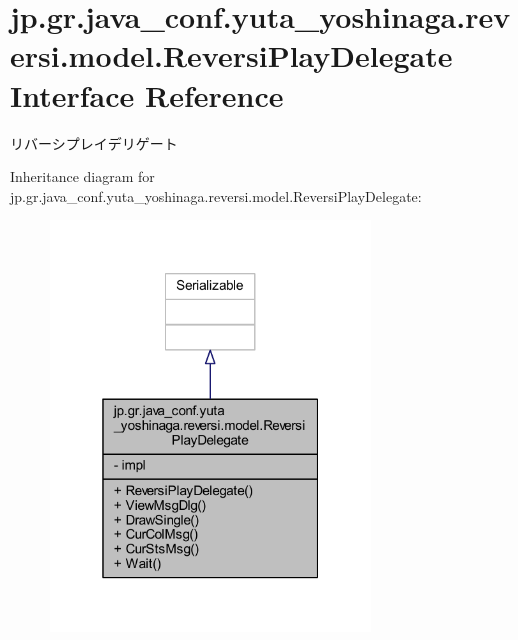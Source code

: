 \hypertarget{classjp_1_1gr_1_1java__conf_1_1yuta__yoshinaga_1_1reversi_1_1model_1_1_reversi_play_delegate}{}\section{jp.\+gr.\+java\+\_\+conf.\+yuta\+\_\+yoshinaga.\+reversi.\+model.\+Reversi\+Play\+Delegate Interface Reference}
\label{classjp_1_1gr_1_1java__conf_1_1yuta__yoshinaga_1_1reversi_1_1model_1_1_reversi_play_delegate}


リバーシプレイデリゲート  




Inheritance diagram for jp.\+gr.\+java\+\_\+conf.\+yuta\+\_\+yoshinaga.\+reversi.\+model.\+Reversi\+Play\+Delegate\+:
\nopagebreak
\begin{figure}[H]
\begin{center}
\leavevmode
\includegraphics[width=241pt]{classjp_1_1gr_1_1java__conf_1_1yuta__yoshinaga_1_1reversi_1_1model_1_1_reversi_play_delegate__inherit__graph}
\end{center}
\end{figure}


